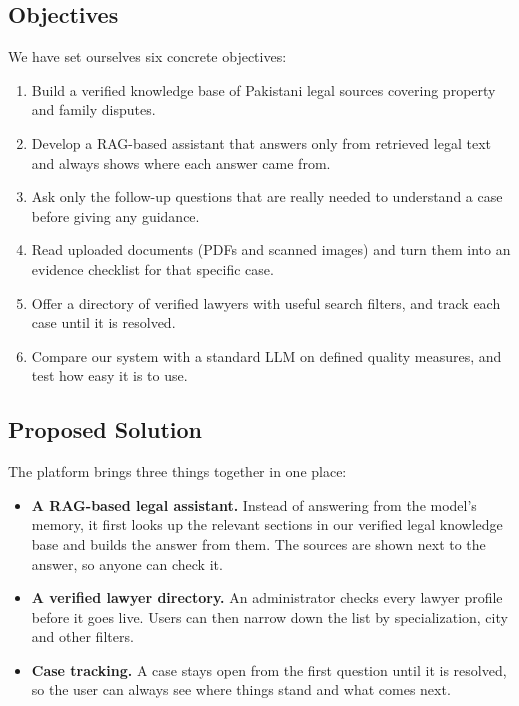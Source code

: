 \documentclass[12pt,a4paper]{report}
\begin{document}
\subsection{Objectives}
We have set ourselves six concrete objectives:
\begin{enumerate}
  \item Build a verified knowledge base of Pakistani legal sources covering property and family disputes.
  \item Develop a RAG-based assistant that answers only from retrieved legal text and always shows where each answer came from.
  \item Ask only the follow-up questions that are really needed to understand a case before giving any guidance.
  \item Read uploaded documents (PDFs and scanned images) and turn them into an evidence checklist for that specific case.
  \item Offer a directory of verified lawyers with useful search filters, and track each case until it is resolved.
  \item Compare our system with a standard LLM on defined quality measures, and test how easy it is to use.
\end{enumerate}

\subsection{Proposed Solution}
The platform brings three things together in one place:
\begin{itemize}
  \item \textbf{A RAG-based legal assistant.} Instead of answering from the model's memory, it first looks up the relevant sections in our verified legal knowledge base and builds the answer from them. The sources are shown next to the answer, so anyone can check it.
  \item \textbf{A verified lawyer directory.} An administrator checks every lawyer profile before it goes live. Users can then narrow down the list by specialization, city and other filters.
  \item \textbf{Case tracking.} A case stays open from the first question until it is resolved, so the user can always see where things stand and what comes next.
\end{itemize}
\end{document}
